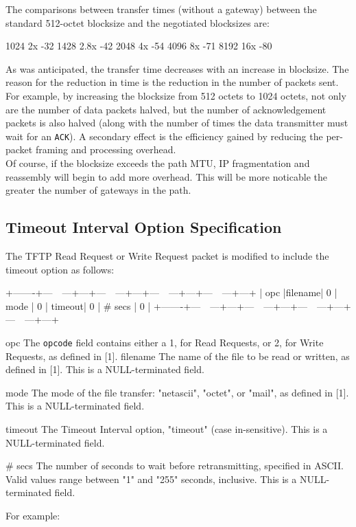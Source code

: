 \documentclass[12pt]{article}
\begin{document}
The comparisons between transfer times (without a gateway) between
the standard 512-octet blocksize and the negotiated blocksizes are:

  1024   2x  -32%
  1428  2.8x  -42%
  2048   4x  -54%
  4096   8x  -71%
  8192  16x  -80%

As was anticipated, the transfer time decreases with an increase in
blocksize. The reason for the reduction in time is the reduction in
the number of packets sent. For example, by increasing the blocksize
from 512 octets to 1024 octets, not only are the number of data
packets halved, but the number of acknowledgement packets is also
halved (along with the number of times the data transmitter must wait
for an \verb|ACK|). A secondary effect is the efficiency gained by reducing
the per-packet framing and processing overhead.\\

Of course, if the blocksize exceeds the path MTU, IP fragmentation
and reassembly will begin to add more overhead. This will be more
noticable the greater the number of gateways in the path.

\subsection{Timeout Interval Option Specification}
The TFTP Read Request or Write Request packet is modified to include
the timeout option as follows:

   +-------+---~~---+---+---~~---+---+---~~---+---+---~~---+---+
   | opc |filename| 0 | mode | 0 | timeout| 0 | \# secs | 0 |
   +-------+---~~---+---+---~~---+---+---~~---+---+---~~---+---+

   opc
     The \verb|opcode| field contains either a 1, for Read Requests, or 2,
     for Write Requests, as defined in [1].
   filename
     The name of the file to be read or written, as defined in [1].
     This is a NULL-terminated field.

   mode
     The mode of the file transfer: "netascii", "octet", or "mail",
     as defined in [1]. This is a NULL-terminated field.

   timeout
     The Timeout Interval option, "timeout" (case in-sensitive).
     This is a NULL-terminated field.

   \# secs
     The number of seconds to wait before retransmitting, specified
     in ASCII. Valid values range between "1" and "255" seconds,
     inclusive. This is a NULL-terminated field.

For example:
\end{document}
